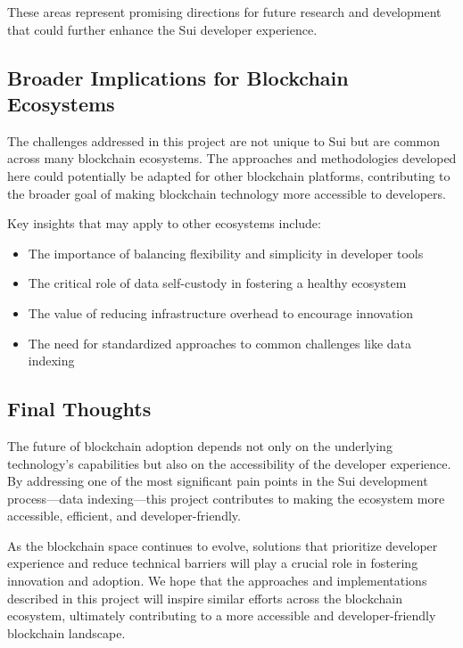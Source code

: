 These areas represent promising directions for future research and development that could further enhance the Sui developer experience.

\subsection{Broader Implications for Blockchain Ecosystems}

The challenges addressed in this project are not unique to Sui but are common across many blockchain ecosystems. The approaches and methodologies developed here could potentially be adapted for other blockchain platforms, contributing to the broader goal of making blockchain technology more accessible to developers.

Key insights that may apply to other ecosystems include:

\begin{itemize}
    \item The importance of balancing flexibility and simplicity in developer tools
    \item The critical role of data self-custody in fostering a healthy ecosystem
    \item The value of reducing infrastructure overhead to encourage innovation
    \item The need for standardized approaches to common challenges like data indexing
\end{itemize}

\subsection{Final Thoughts}

The future of blockchain adoption depends not only on the underlying technology's capabilities but also on the accessibility of the developer experience. By addressing one of the most significant pain points in the Sui development process—data indexing—this project contributes to making the ecosystem more accessible, efficient, and developer-friendly.

As the blockchain space continues to evolve, solutions that prioritize developer experience and reduce technical barriers will play a crucial role in fostering innovation and adoption. We hope that the approaches and implementations described in this project will inspire similar efforts across the blockchain ecosystem, ultimately contributing to a more accessible and developer-friendly blockchain landscape. 